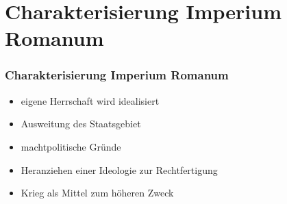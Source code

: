 \section[Imperium Romanum]{Charakterisierung Imperium Romanum}
\begin{frame}
	\frametitle{Charakterisierung Imperium Romanum}
	\begin{itemize}
	\item<2->eigene Herrschaft wird idealisiert
	\item<3->Ausweitung des Staatsgebiet
	\item<4->machtpolitische Gründe
	\item<5->Heranziehen einer Ideologie zur Rechtfertigung
	\item<6->Krieg als Mittel zum höheren Zweck
	\end{itemize}
\end{frame}